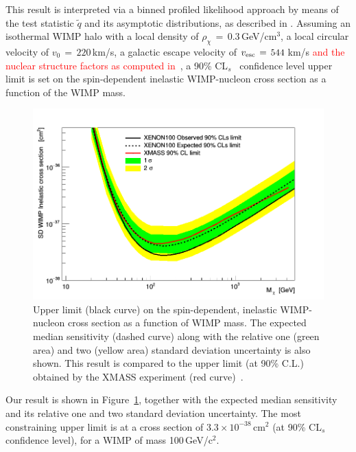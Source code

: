 This result is interpreted via a binned profiled likelihood approach by means of the test statistic $\tilde{q}$
and its asymptotic distributions, as  described in \cite{asympt}. 
Assuming  an isothermal WIMP halo with a local density of $\rho_{\chi} \, = \, 0.3$\,GeV/cm$^3$, a local circular velocity of $v_0 \,= \, 220$\,km/s, 
a galactic escape velocity of $v_{\rm{esc}} \, = \, 544$\,km/s 
\textcolor{red} {and the nuclear structure factors as computed in}~\cite{Baudis:2013qla}, 
a 90\% CL$_s$~\cite{cls} confidence level upper limit is set on the spin-dependent inelastic WIMP-nucleon cross section as a function of the WIMP mass. 

\begin{figure}[th]
  \includegraphics[width=\linewidth]{images/limit_reb.png}
  \caption{Upper limit (black curve) on the spin-dependent, inelastic WIMP-nucleon cross section as a function of WIMP mass.  The expected median sensitivity (dashed curve) along with the relative one (green area) and two (yellow area) standard deviation uncertainty is also shown. This result is compared to the upper limit (at 90\% C.L.) obtained by the XMASS experiment (red curve)~\cite{Uchida:2014cnn}.}
  \label{fig:limits}
\end{figure}


Our result is shown in Figure~\ref{fig:limits}, together with the expected median sensitivity and its relative one and two  standard deviation uncertainty.
The most constraining upper limit is  at a cross section of $3.3 \times 10^{-38}$\,cm$^{2}$ (at 90\% CL$_s$ confidence level), for a WIMP of mass 100\,GeV/c$^2$. 

